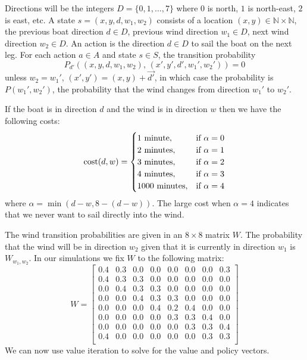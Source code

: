 \documentclass[10pt,amstags,fleqn]{article}
\theoremstyle{plain}
\theoremstyle{definition}
\theoremstyle{definition}
\begin{document}
Directions will be the integers 
$D = \{0, 1, \dots, 7 \}$ where $0$ is north, $1$ is
north-east, $2$ is east, etc. A state $s = (x,y,d,w_1,w_2)$ consists of a location $(x,y) \in
\mathbb{N} \times \mathbb{N}$, the previous boat direction $d \in D$,
previous wind direction $w_1 \in D$, next wind direction $w_2 \in D$.
An action is the direction $d \in D$ to sail the boat on the next leg.
For each action $a \in A$ and state $s \in S$, the transition
probability
\[
P_{d'}((x,y,d,w_1,w_2),\,(x',y',d',w_1',w_2')) = 0
\]
unless $w_2 = w_1'$, $(x',y') = (x,y) + \vec{d'}$, in which case the
probability is $P(w_1', w_2')$, the probability that the wind changes
from direction $w_1'$ to $w_2'$.

If the boat is in direction $d$ and the wind is in direction $w$ then we
have the following costs:
\[
\textnormal{cost}(d,w) =
\begin{cases} 
    1\textnormal{ minute}, &\textnormal{if $\alpha = 0$} \\
    2\textnormal{ minutes}, &\textnormal{if $\alpha = 1$} \\
    3\textnormal{ minutes}, &\textnormal{if $\alpha = 2$} \\
    4\textnormal{ minutes}, &\textnormal{if $\alpha = 3$} \\
    1000\textnormal{ minutes}, &\textnormal{if $\alpha = 4$}
\end{cases}
\]
where $\alpha = \min(d-w, 8-(d-w))$. The large cost when
$\alpha = 4$ indicates that we never want to sail directly into the
wind.

The wind transition probabilities are given in an $8 \times 8$ matrix
$W$. The probability that the wind will be in direction $w_2$ given that it
is currently in direction $w_1$ is $W_{w_1,w_2}$. In our simulations we fix
$W$ to the following matrix: 
\[
W =
\left[ {\begin{array}{cccccccc}
0.4 & 0.3 & 0.0 & 0.0 & 0.0 & 0.0 & 0.0 & 0.3 \\
0.4 & 0.3 & 0.3 & 0.0 & 0.0 & 0.0 & 0.0 & 0.0 \\
0.0 & 0.4 & 0.3 & 0.3 & 0.0 & 0.0 & 0.0 & 0.0 \\
0.0 & 0.0 & 0.4 & 0.3 & 0.3 & 0.0 & 0.0 & 0.0 \\
0.0 & 0.0 & 0.0 & 0.4 & 0.2 & 0.4 & 0.0 & 0.0 \\
0.0 & 0.0 & 0.0 & 0.0 & 0.3 & 0.3 & 0.4 & 0.0 \\
0.0 & 0.0 & 0.0 & 0.0 & 0.0 & 0.3 & 0.3 & 0.4 \\
0.4 & 0.0 & 0.0 & 0.0 & 0.0 & 0.0 & 0.3 & 0.3 \\
 \end{array} } \right]
\]
We can now use value iteration to solve for the value and policy
vectors.
\end{document}
